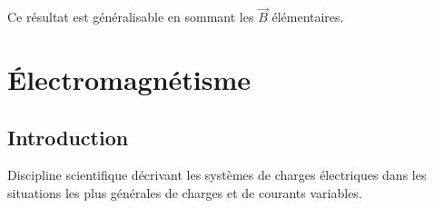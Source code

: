 \documentclass	[11pt, a4paper, openany]{book}
\begin{document}
Ce résultat est généralisable en sommant les $\vec{B}$ élémentaires.
















































\chapter{Électromagnétisme}
\section{Introduction}
Discipline scientifique décrivant les systèmes de charges électriques dans les situations les plus générales de charges et de courants variables.
\end{document}
